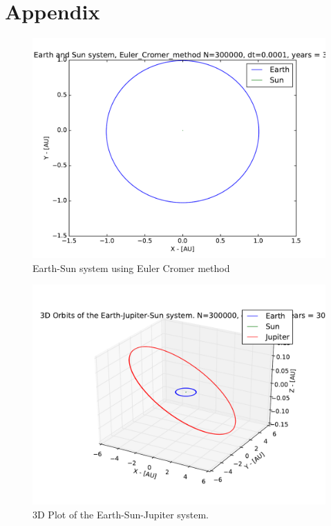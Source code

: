 \documentclass[12pt]{article}
\begin{document}
\newpage
\section*{Appendix}
\begin{figure}[hbtp]
\centering
\includegraphics[width=\linewidth]{Plots/Earth_Sun_Euler_Cromer_method.pdf}
\caption{Earth-Sun system using Euler Cromer method}
\end{figure}

\begin{figure}[hbtp]
\centering
\includegraphics[width=\linewidth]{Plots/Earth_Sun_Jupiter_3D.pdf}
\caption{3D Plot of the Earth-Sun-Jupiter system.}
\end{figure}
\end{document}
